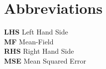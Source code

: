 \documentclass[openany]{article}
\begin{document}
%

\clearpage\thispagestyle{empty}\null\newpage %

\newpage
\thispagestyle{plain}

\section*{Abbreviations}

\textbf{LHS} Left Hand Side \\

\textbf{MF} Mean-Field \\

\textbf{RHS} Right Hand Side \\

\textbf{MSE} Mean Squared Error

\clearpage\thispagestyle{empty}\null\newpage %

\newpage
\thispagestyle{plain}
{
    \tableofcontents
}


\thispagestyle{empty}

\clearpage\thispagestyle{empty}\null\newpage %


\newpage


\newpage


\newpage


\newpage


\newpage


\newpage


\newpage


\newpage

\end{document}
